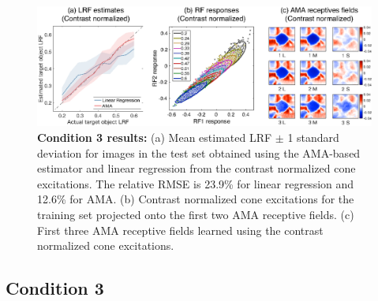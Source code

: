 \documentclass{jov}
\begin{document}
\begin{figure}
\centering
\includegraphics{Figure12.eps}
    \caption{{\bf Condition 3 results:} (a) Mean estimated LRF $\pm$ 1 standard deviation for images in the test set obtained using the AMA-based estimator and linear regression from the contrast normalized cone excitations. The relative RMSE is 23.9\%  for linear regression and 12.6\% for AMA. (b) Contrast normalized cone excitations for the training set projected onto the first two AMA receptive fields. (c) First three AMA receptive fields learned using the contrast normalized cone excitations.}
\label{fig:Condition3}
\end{figure}

\subsection{Condition 3}
\end{document}
